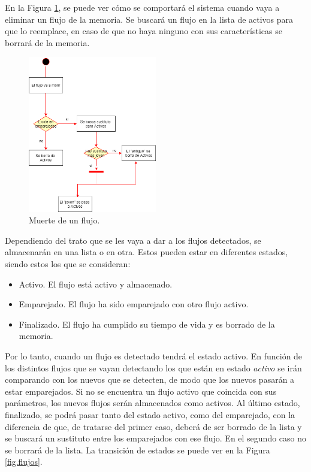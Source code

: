\intro En la Figura \ref{fig.muerte}, se puede ver cómo se comportará el sistema cuando vaya a eliminar un flujo de la memoria. Se 
buscará un flujo en la lista de activos para que lo reemplace, en caso de que no haya ninguno con sus características se borrará de la 
memoria.

\begin{figure}[H]
  \includegraphics[width=0.5\textwidth]{imagenes/muerte.png}
  \centering
  \caption{Muerte de un flujo.}\label{fig.muerte}
\end{figure}

\intro Dependiendo del trato que se les vaya a dar a los flujos detectados, se almacenarán en una lista o en otra. Estos pueden estar 
en diferentes estados, siendo estos los que se consideran:

\begin{itemize}
\item Activo. El flujo está activo y almacenado.
\item Emparejado. El flujo ha sido emparejado con otro flujo activo.
\item Finalizado. El flujo ha cumplido su tiempo de vida y es borrado de la memoria.
\end{itemize}

\intro Por lo tanto, cuando un flujo es detectado tendrá el estado activo. En función 
de los distintos flujos que se vayan detectando los que están en estado \textit{activo} se irán comparando con los nuevos que se detecten, de modo que los nuevos pasarán a estar emparejados. Si no se encuentra un flujo activo que coincida con sus parámetros, los nuevos flujos serán almacenados como activos. Al último estado, finalizado, se podrá pasar tanto del estado activo, como del emparejado, con la diferencia de que, de tratarse del primer caso, deberá de ser borrado de la lista y se buscará un sustituto entre los emparejados con ese flujo. En el segundo caso no se borrará de la lista. La transición de estados se puede ver en la Figura \ref{fig.flujos}.

